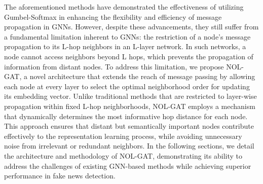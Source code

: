 The aforementioned methods have demonstrated the effectiveness of utilizing Gumbel-Softmax in enhancing the flexibility and efficiency of message propagation in GNNs.
However, despite these advancements, they still suffer from a fundamental limitation inherent to GNNs: the restriction of a node's message propagation to its L-hop neighbors in an L-layer network.
In such networks, a node cannot access neighbors beyond L hops, which prevents the propagation of information from distant nodes.
To address this limitation, we propose NOL-GAT, a novel architecture that extends the reach of message passing by allowing each node at every layer to select the optimal neighborhood order for updating its embedding vector.
Unlike traditional methods that are restricted to layer-wise propagation within fixed L-hop neighborhoods, NOL-GAT employs a mechanism that dynamically determines the most informative hop distance for each node.
This approach ensures that distant but semantically important nodes contribute effectively to the representation learning process, while avoiding unnecessary noise from irrelevant or redundant neighbors.
In the following sections, we detail the architecture and methodology of NOL-GAT, demonstrating its ability to address the challenges of existing GNN-based methods while achieving superior performance in fake news detection.